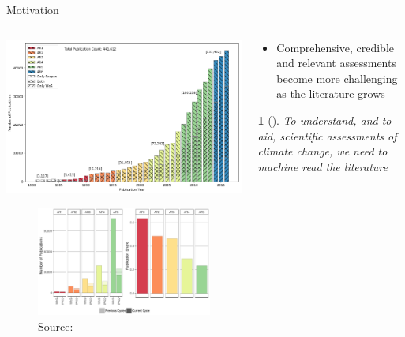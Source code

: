 \documentclass[9pt]{beamer}
\newtheorem*{remark}{}
\begin{document}
\begin{frame}{Motivation}

\begin{columns}
	\begin{column}{0.5\linewidth}
		\begin{center}
			\includegraphics[width=0.85\linewidth]{../plots/wos_scopus_docs_time.png}
\begin{figure}
	\includegraphics[width=0.85\linewidth]{merged_IPCC_spectral.png}
	\caption{Source: \citet{Minx2017} }
\end{figure}
		\end{center}
	\end{column}
	\begin{column}{0.5\linewidth}
		\begin{center}
			\begin{itemize}
				\item Comprehensive, credible and relevant assessments become
				more challenging as the literature grows
			\end{itemize}
		\begin{remark}[]
			To understand, and to aid, scientific assessments of climate change, we need to machine read the literature
		\end{remark}
		\end{center}
	\end{column}
\end{columns}

\end{frame}
\end{document}
